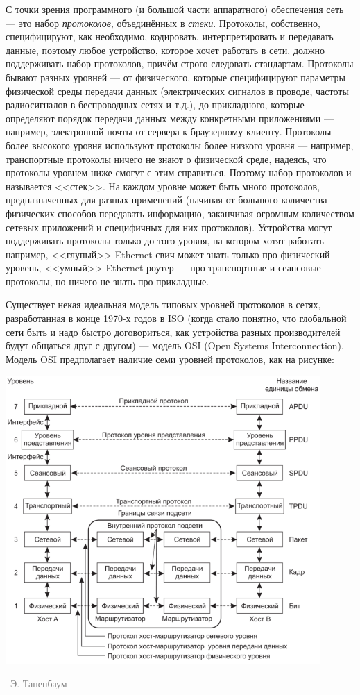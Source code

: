 \documentclass[a5paper]{article}
\newcommand{\attribution}[1] {
\vspace{-5mm}\begin{flushright}\begin{scriptsize}\textcolor{gray}{\textcopyright\, #1}\end{scriptsize}\end{flushright}
}
\begin{document}
С точки зрения программного (и большой части аппаратного) обеспечения сеть --- это набор \textit{протоколов}, объединённых в \textit{стеки}. Протоколы, собственно, специфицируют, как необходимо, кодировать, интерпретировать и передавать данные, поэтому любое устройство, которое хочет работать в сети, должно поддерживать набор протоколов, причём строго следовать стандартам. Протоколы бывают разных уровней --- от физического, которые специфицируют параметры физической среды передачи данных (электрических сигналов в проводе, частоты радиосигналов в беспроводных сетях и т.д.), до прикладного, которые определяют порядок передачи данных между конкретными приложениями --- например, электронной почты от сервера к браузерному клиенту. Протоколы более высокого уровня используют протоколы более низкого уровня --- например, транспортные протоколы ничего не знают о физической среде, надеясь, что протоколы уровнем ниже смогут с этим справиться. Поэтому набор протоколов и называется <<стек>>. На каждом уровне может быть много протоколов, предназначенных для разных применений (начиная от большого количества физических способов передавать информацию, заканчивая огромным количеством сетевых приложений и специфичных для них протоколов). Устройства могут поддерживать протоколы только до того уровня, на котором хотят работать --- например, <<глупый>> Ethernet-свич может знать только про физический уровень, <<умный>> Ethernet-роутер --- про транспортные и сеансовые протоколы, но ничего не знать про прикладные.

Существует некая идеальная модель типовых уровней протоколов в сетях, разработанная в конце 1970-х годов в ISO (когда стало понятно, что глобальной сети быть и надо быстро договориться, как устройства разных производителей будут общаться друг с другом) --- модель OSI (Open Systems Interconnection). Модель OSI предполагает наличие семи уровней протоколов, как на рисунке:

\begin{center}
    \includegraphics[width=0.9\textwidth]{osiStack.png}
    \attribution{Э. Таненбаум}
\end{center}
\end{document}
